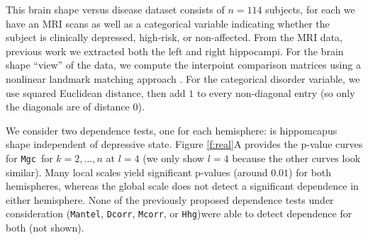 \documentclass[11pt]{article}
\providecommand{\sct}[1]{{\sc \texttt{#1}}}
\newcommand{\Mgc}{\sct{Mgc}}
\newcommand{\Hhg}{\sct{Hhg}}
\newcommand{\Dcorr}{\sct{Dcorr}}
\newcommand{\Mcorr}{\sct{Mcorr}}
\newcommand{\Mantel}{\sct{Mantel}}
\begin{document}

This brain shape versus disease dataset consists of $n=114$ subjects, for each we have an MRI scans as well as a categorical variable indicating whether the subject is clinically depressed, high-risk, or non-affected.  From the MRI data, previous work we extracted both the left and right hippocampi.   For the brain shape ``view'' of the data, we compute the interpoint comparison matrices using a nonlinear landmark matching approach \cite{ParkEtAl2008,BegEtAl2005}.
For the categorical disorder variable,
we use squared Euclidean distance, then add $1$ to every non-diagonal entry (so only the diagonals are of distance $0$).

We consider two dependence tests, one for each hemisphere: is hippomcapus shape independent of depressive state.
Figure \ref{f:real}A provides the p-value curves for \Mgc~for $k=2,\ldots,n$ at $l=4$  (we only show $l=4$ because the other curves look similar). Many local scales yield significant p-values (around $0.01$) for both hemispheres, whereas the global scale does not detect a significant dependence in either hemisphere. None of the previously proposed dependence tests under consideration (\Mantel, \Dcorr, \Mcorr, or \Hhg)were able to detect dependence for both (not shown).
\end{document}
